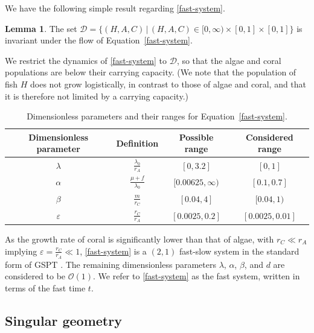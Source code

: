 \documentclass{article}
\theoremstyle{definition}
\numberwithin{equation}{section}
\newtheorem{lem}[prop]{Lemma}
\begin{document}
We have the following simple result regarding \eqref{fast-system}.
\begin{lem}
    The set $\mathcal{D}=\{(H,A,C)\,|\,(H,A,C)\in [0, \infty)\times [0,1]\times[0,1]\}$ is invariant under the flow of Equation~\eqref{fast-system}. 
    \label{lem: octant invariance}
\end{lem}
We restrict the dynamics of \eqref{fast-system} to $\mathcal{D}$, so that the algae and coral populations are below their carrying capacity. (We note that the population of fish $H$ does not grow logistically, in contrast to those of algae and coral, and that it is therefore not limited by a carrying capacity.)  
\begin{table}[ht]
    \centering
    \begin{tabular}{|c|c|c|c|} 
    \hline
    \textbf{Dimensionless parameter} & \textbf{Definition} & \textbf{Possible range} &\textbf{Considered range}\\
    \hline
    $\lambda$ & $\frac{\lambda_0}{r_A}$ & $[0, 3.2]$ & $[0,1]$\\
    \hline
    $\alpha$ & $\frac{\mu+f}{ \lambda_0}$ & $[0.00625, \infty)$  & $[0.1, 0.7]$\\
    \hline
    $\beta$ & $\frac{m}{r_C}$ & $[0.04, 4]$ & $[0.04, 1)$\\
    \hline
    $\varepsilon$ & $\frac{r_C}{r_A}$ & $[0.0025, 0.2]$ & $[0.0025, 0.01]$\\
    
    \hline
    \end{tabular}
    \caption{Dimensionless parameters and their ranges for Equation~\eqref{fast-system}.}
    \label{param_table_2}
\end{table}
As the growth rate of coral is significantly lower than that of algae, with $r_C\ll r_A$ implying $\varepsilon=\frac{r_C}{r_A}\ll 1$, \eqref{fast-system} is a $(2,1)$ fast-slow system in the standard form of GSPT \cite{MTSD}. The remaining dimensionless parameters $\lambda$, $\alpha$, $\beta$, and $d$ are considered to be $\mathcal{O}(1)$. 
We refer to \eqref{fast-system} as the fast system, written in terms of the fast time $t$.

\subsection{Singular geometry}
\end{document}
